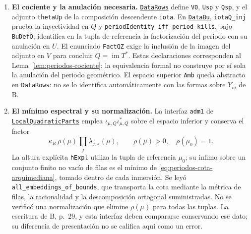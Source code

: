 \begin{enumerate}
\item \textbf{El cociente y la anulación necesaria.}
\href{https://github.com/CocoSgt/riemann-hypothesis-lean/blob/7cbf7a0c32fca1badf05931879a37c3f8a2b03b4/src/Formalism/LocalRingCardinality/DataRows.lean}{\texttt{DataRows}}
define \texttt{V0}, \texttt{Usp} y \texttt{Qsp}, y el adjunto
\texttt{thetaUp} de la composición descendente \texttt{iota}.
En
\href{https://github.com/CocoSgt/riemann-hypothesis-lean/blob/7cbf7a0c32fca1badf05931879a37c3f8a2b03b4/src/Formalism/LocalRingCardinality/DataBu.lean}{\texttt{DataBu}},
\texttt{iotaQ\_inj} prueba la inyectividad en $Q$ y
\texttt{periodIdentity\_iff\_period\_kills}, bajo
\texttt{BuDefQ}, identifica en la tupla de referencia la factorización
del periodo con su anulación en $U$. El enunciado \texttt{FactQZ}
exige la inclusión de la imagen del adjunto en $V$ para concluir
$Q=\operatorname{im}T^*$. Estas declaraciones corresponden
al Lema~\ref{lem:periodos-cociente}; la equivalencia formal no
construye por sí sola la anulación del periodo geométrico.
El espacio superior \texttt{Amb} queda abstracto en
\texttt{DataRows}: no se lo identifica automáticamente con las
formas sobre $Y_m$ de B.

\item \textbf{El mínimo espectral y su normalización.}
La interfaz \texttt{adm1} de
\href{https://github.com/CocoSgt/riemann-hypothesis-lean/blob/7cbf7a0c32fca1badf05931879a37c3f8a2b03b4/src/Formalism/SharpRestriction/Divisibility/LocalQuadraticParts.lean}{\texttt{LocalQuadraticParts}}
emplea $\iota_{\mu,Q}\iota_{\mu,Q}^*$ sobre el espacio inferior
y conserva el factor
\[
 \kappa_R\,\rho(\mu)\prod_j\lambda_{j,\pi}(\mu),
 \qquad \rho(\mu)>0,\quad \rho(\mu_0)=1.
\]
La altura explícita \texttt{hExpl} utiliza la tupla de referencia
$\mu_0$; su ínfimo sobre un conjunto finito no vacío de filas es
el mínimo de \eqref{eq:periodos-cota-arquimediana}, tomado dentro
de cada inmersión. Se leyó \texttt{all\_embeddings\_of\_bounds},
que transporta la cota mediante la métrica de filas, la racionalidad
y la descomposición ortogonal suministradas. No se verificó una
normalización que elimine $\rho(\mu)$ para todas las tuplas.
La escritura de B, p.~29, y esta interfaz deben compararse
conservando ese dato; su diferencia de presentación no se califica
aquí como un error.


\end{enumerate}

